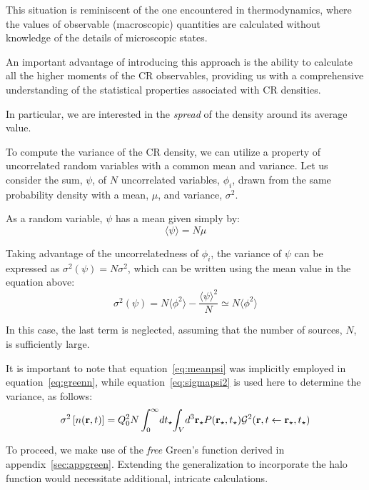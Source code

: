 This situation is reminiscent of the one encountered in thermodynamics, where the values of observable (macroscopic) quantities are calculated without knowledge of the details of microscopic states.

An important advantage of introducing this approach is the ability to calculate all the higher moments of the CR observables, providing us with a comprehensive understanding of the statistical properties associated with CR densities.

In particular, we are interested in the \emph{spread} of the density around its average value. 

To compute the variance of the CR density, we can utilize a property of uncorrelated random variables with a common mean and variance. Let us consider the sum, $\psi$, of $N$ uncorrelated variables, $\phi_i$, drawn from the same probability density with a mean, $\mu$, and variance, $\sigma^2$.

As a random variable, $\psi$ has a mean given simply by:
%
\begin{equation}
\langle \psi \rangle = N \mu
\label{eq:meanpsi}
\end{equation}

Taking advantage of the uncorrelatedness of $\phi_i$, the variance of $\psi$ can be expressed as $\sigma^2(\psi) = N \sigma^2$, which can be written using the mean value in the equation above:
%
\begin{equation}
\sigma^2(\psi) = N \langle \phi^2 \rangle - \frac{\langle \psi \rangle^2}{N} \simeq N \langle \phi^2 \rangle
\label{eq:sigmapsi2}
\end{equation}

In this case, the last term is neglected, assuming that the number of sources, $N$, is sufficiently large.

It is important to note that equation~\eqref{eq:meanpsi} was implicitly employed in equation~\eqref{eq:greenn}, while equation~\eqref{eq:sigmapsi2} is used here to determine the variance, as follows:
%
\begin{equation}
\sigma^2 \left[ n(\vb r, t) \right] =
Q_0^2 N  
\int_0^{\infty} \! dt_\star \! \int_{V} \! d^3 \vb r_\star
P(\vb r_\star, t_\star) 
\mathcal G^2(\vb r, t \leftarrow \vb r_\star, t_\star)
\end{equation}

To proceed, we make use of the \emph{free} Green's function derived in appendix~\ref{sec:appgreen}. 
%
Extending the generalization to incorporate the halo function would necessitate additional, intricate calculations.

